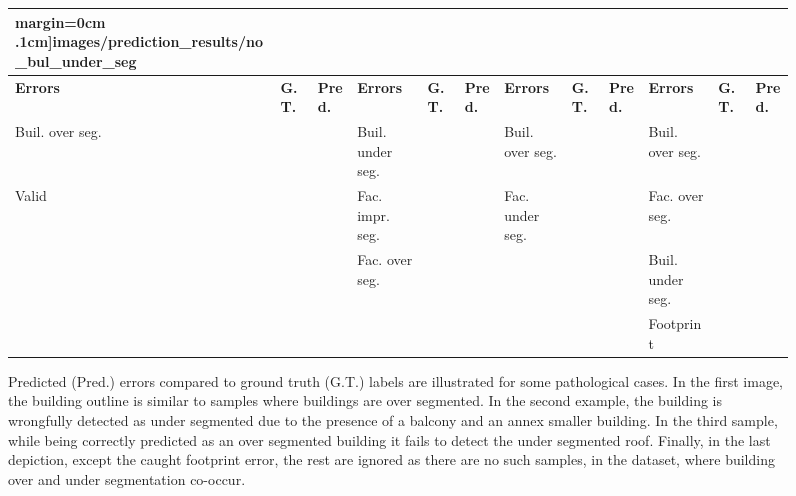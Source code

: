 \documentclass[runningheads]{llncs}
\newcommand{\cmark}{{\color{green} \ding{51}}}%
\newcommand{\xmark}{{\color{red} \ding{55}}}%
\begin{document}
\begin{figure}
\begin{center}
\begin{tabular}{| x{1.11cm} | x{.75cm} | x{.75cm} || x{1.11cm} | x{.75cm} | x{.75cm} || x{1.11cm} | x{.75cm} | x{.75cm} || x{1.11cm} | x{.75cm} | x{.75cm} |}
margin=0cm .1cm]{images/prediction_results/no_bul_under_seg}} \\
			\hline
			\textbf{Errors} & \textbf{G.T.} & \textbf{Pred.} & \textbf{Errors} & \textbf{G.T.} & \textbf{Pred.} & \textbf{Errors} & \textbf{G.T.} & \textbf{Pred.} & \textbf{Errors} & \textbf{G.T.} & \textbf{Pred.}\\
            \hline
            Buil. over seg. & \xmark & \cmark & Buil. under seg. & \xmark & \cmark & Buil. over seg. & \cmark & \cmark & Buil. over seg. & \cmark & \xmark \\
            Valid & \cmark & \xmark & Fac. impr. seg. & \cmark & \xmark & Fac. under seg. & \cmark & \xmark &  Fac. over seg. & \cmark & \xmark \\
             &  &  & Fac. over seg. & \cmark & \xmark &  &  &  & Buil. under seg. & \cmark & \xmark \\
             &  &  &  &  &  &  &  &  &  Footprint & \cmark & \cmark \\
            \hline
		\end{tabular}
        \caption{\label{fig::results} Predicted (Pred.) errors compared to ground truth (G.T.) labels are illustrated for some pathological cases. In the first image, the building outline is similar to samples where buildings are over segmented. In the second example, the building is wrongfully detected as under segmented due to the presence of a balcony and an annex smaller building. In the third sample, while being correctly predicted as an over segmented building it fails to detect the under segmented roof. Finally, in the last depiction, except the caught footprint error, the rest are ignored as there are no such samples, in the dataset, where building over and under segmentation co-occur.}

\end{center}
\end{figure}
\end{document}
